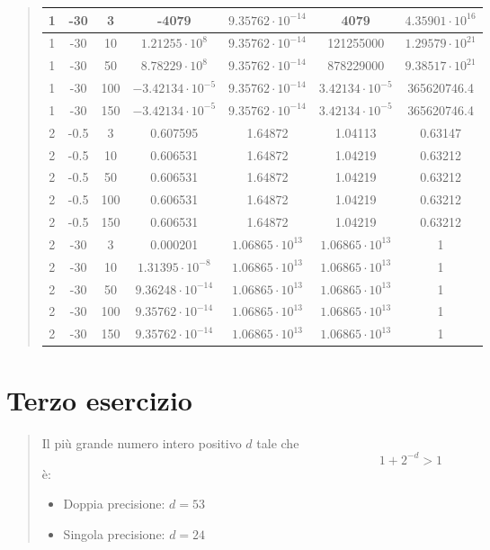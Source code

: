 \documentclass[10pt]{article}
\begin{document}
\begin{quote}
\begin{tabular}{| c | c | c | c | c | c | c |}
        \hline
        1 & -30 & 3 & -4079 & $9.35762\cdot10^{-14}$ & 4079 & $4.35901\cdot10^{16}$ \\
        \hline
        1 & -30 & 10 & $1.21255\cdot10^{8}$ & $9.35762\cdot10^{-14}$ & 121255000 & $1.29579\cdot10^{21}$ \\
        \hline
        1 & -30 & 50 & $8.78229\cdot10^{8}$ & $9.35762\cdot10^{-14}$ & 878229000 & $9.38517\cdot10^{21}$ \\
        \hline
        1 & -30 & 100 & $-3.42134\cdot10^{-5}$ & $9.35762\cdot10^{-14}$ & $3.42134\cdot10^{-5}$ & 365620746.4\\
        \hline
        1 & -30 & 150 & $-3.42134\cdot10^{-5}$ & $9.35762\cdot10^{-14}$ & $3.42134\cdot10^{-5}$ & 365620746.4 \\
        \hline
        2 & -0.5 & 3 & 0.607595 & 1.64872 & 1.04113 & 0.63147 \\
        \hline
        2 & -0.5 & 10 & 0.606531 & 1.64872 & 1.04219 & 0.63212 \\
        \hline
        2 & -0.5 & 50 & 0.606531 & 1.64872 & 1.04219 & 0.63212 \\
        \hline
        2 & -0.5 & 100 & 0.606531 & 1.64872 & 1.04219 & 0.63212 \\
        \hline
        2 & -0.5 & 150 & 0.606531 & 1.64872 & 1.04219 & 0.63212 \\
        \hline
        2 & -30 & 3 & 0.000201 & $1.06865\cdot10^{13}$ & $1.06865\cdot10^{13}$ & 1 \\
        \hline
        2 & -30 & 10 & $1.31395\cdot10^{-8}$ & $1.06865\cdot10^{13}$ & $1.06865\cdot10^{13}$ & 1 \\
        \hline
        2 & -30 & 50 & $9.36248\cdot10^{-14}$ & $1.06865\cdot10^{13}$ & $1.06865\cdot10^{13}$ & 1 \\
        \hline
        2 & -30 & 100 & $9.35762\cdot10^{-14}$ & $1.06865\cdot10^{13}$ & $1.06865\cdot10^{13}$ & 1 \\
        \hline
        2 & -30 & 150 & $9.35762\cdot10^{-14}$ & $1.06865\cdot10^{13}$ & $1.06865\cdot10^{13}$ & 1 \\
        \hline
    \end{tabular}
\end{quote}
\newpage
\section{Terzo esercizio}
\begin{quote}
    Il più grande numero intero positivo $d$ tale che \begin{equation*}
        1+2^{-d} > 1
    \end{equation*}
    è:
    \begin{itemize}
        \item Doppia precisione: $d=53$
        \item Singola precisione: $d=24$
    \end{itemize}
\end{quote}
\end{document}
